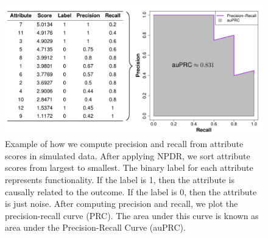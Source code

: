 \documentclass[10pt,letterpaper]{article}
\begin{document}
\begin{figure}[!h]
	\centering
	\includegraphics[width=\textwidth]{precision_recall_table.pdf}
	\caption[Example of precision and recall for attribute scores]{Example of how we compute precision and recall from attribute scores in simulated data. After applying NPDR, we sort attribute scores from largest to smallest. The binary label for each attribute represents functionality. If the label is 1, then the attribute is causally related to the outcome. If the label is 0, then the attribute is just noise. After computing precision and recall, we plot the precision-recall curve (PRC). The area under this curve is known as area under the Precision-Recall Curve (auPRC).}\label{tab:auPRC}
\end{figure}
\end{document}
